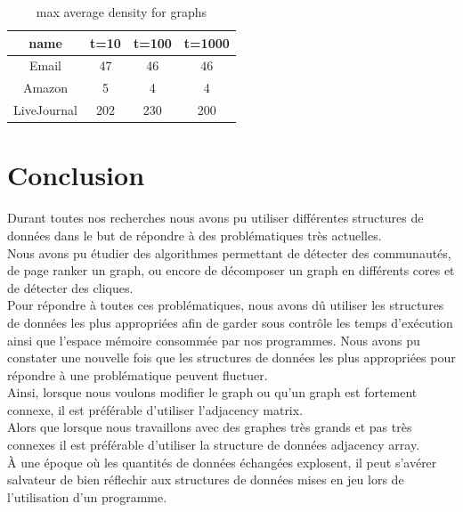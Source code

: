 \documentclass[a4paper,10pt]{report}
\begin{document}
\begin{table}[ht]
\caption{max average density for graphs}
\centering
\begin{tabular}{|c c c c|}
\hline\hline
name & t=10 & t=100 & t=1000  \\[0.5ex]
\hline
Email & 47 & 46 & 46\\
Amazon & 5 &  4 & 4\\
LiveJournal & 202 & 230 & 200\\
\hline
\end{tabular}
\label {table:nonlin}
\end{table}
\chapter{Conclusion}
Durant toutes nos recherches nous avons pu utiliser différentes structures de données dans le but de répondre à des problématiques très actuelles. 
\\
Nous avons pu étudier des algorithmes permettant de détecter des communautés, de page ranker un graph, ou encore de décomposer un graph en différents cores et de détecter des cliques.
\\
\newline
Pour répondre à toutes ces problématiques, nous avons dû utiliser les structures de données les plus appropriées afin de garder sous contrôle les temps d'exécution ainsi que l'espace mémoire consommée par nos programmes.
\newline
Nous avons pu constater une nouvelle fois que les structures de données les plus appropriées pour répondre à une problématique peuvent fluctuer.
\\
Ainsi, lorsque nous voulons modifier le graph ou qu'un graph est fortement connexe, il est préférable d'utiliser l'adjacency matrix.\\
Alors que lorsque nous travaillons avec des graphes très grands et pas très connexes il est préférable d'utiliser la structure de données adjacency array.
\newline
\\
À une époque où les quantités de données échangées explosent, il peut s'avérer salvateur de bien réflechir aux structures de données mises en jeu lors de l'utilisation d'un programme.
\end{document}
